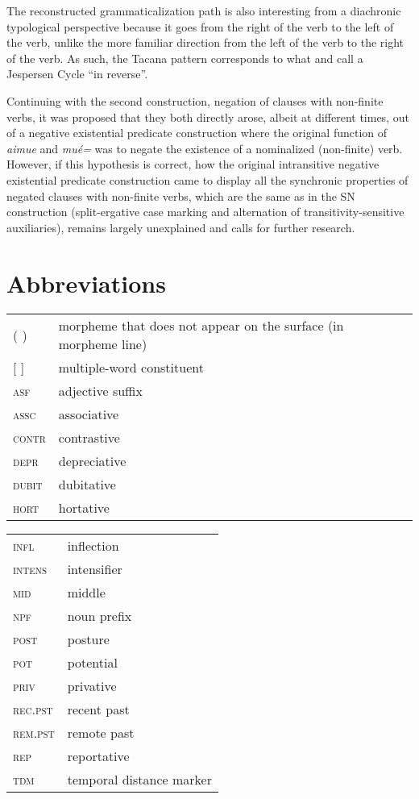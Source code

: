 \documentclass[output=paper]{langsci/langscibook}
\begin{document}
The reconstructed grammaticalization path is also interesting from a
diachronic typological perspective because it goes from the right of the
verb to the left of the verb, unlike the more familiar direction from the
left of the verb to the right of the verb. As such, the Tacana pattern
corresponds to what \citet{AuweraVossen2016} and \citet{Vossen2016} call a
Jespersen Cycle ``in reverse''.

Continuing with the second construction, negation of clauses with
non-finite verbs, it was proposed that they both directly arose, albeit at
different times, out of a negative existential predicate construction where
the original function of \textit{aimue} and \textit{mué=} was to negate the
existence of a nominalized (non-finite) verb. However, if this hypothesis
is correct, how the original
intransitive negative existential predicate construction came to display all the synchronic properties
of negated clauses with non-finite verbs, which are the same as in the SN
construction (split-ergative case marking
and alternation of transitivity-sensitive auxiliaries), remains
largely unexplained and calls for further research.

\section*{Abbreviations}
\begin{tabularx}{.45\textwidth}{lQ}
    ( ) & morpheme that does not appear on the surface (in morpheme line) \\
    {[} {]} & multiple-word constituent \\
    \textsc{asf} & adjective suffix \\
    \textsc{assc} & associative \\
    \textsc{contr} & contrastive \\
    \textsc{depr} & depreciative \\
    \textsc{dubit} & dubitative \\
    \textsc{hort} & hortative \\
    \end{tabularx}
\begin{tabularx}{.45\textwidth}{lQ}
    \textsc{infl} & inflection \\
    \textsc{intens} & intensifier \\
    \textsc{mid} & middle \\
    \textsc{npf} & noun prefix \\
    \textsc{post} & posture \\
    \textsc{pot} & potential \\
    \textsc{priv} & privative \\
    \textsc{rec.pst} & recent past \\
    \textsc{rem.pst} & remote past \\
    \textsc{rep} & reportative \\
    \textsc{tdm} & temporal distance marker \\
\end{tabularx}
\end{document}
